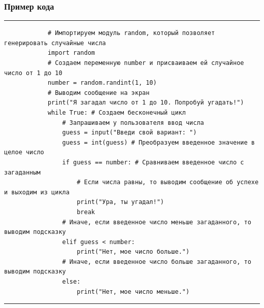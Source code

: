 \documentclass[handout]{beamer}
\begin{document}
    \begin{frame}[fragile]
        \frametitle{Пример кода}
        \scriptsize
        \rule{\textwidth}{1pt}
        \begin{verbatim}
            # Импортируем модуль random, который позволяет генерировать случайные числа
            import random
            # Создаем переменную number и присваиваем ей случайное число от 1 до 10
            number = random.randint(1, 10)
            # Выводим сообщение на экран
            print("Я загадал число от 1 до 10. Попробуй угадать!")
            while True: # Создаем бесконечный цикл
                # Запрашиваем у пользователя ввод числа
                guess = input("Введи свой вариант: ") 
                guess = int(guess) # Преобразуем введенное значение в целое число
                if guess == number: # Сравниваем введенное число с загаданным
                    # Если числа равны, то выводим сообщение об успехе и выходим из цикла
                    print("Ура, ты угадал!")
                    break
                # Иначе, если введенное число меньше загаданного, то выводим подсказку
                elif guess < number:
                    print("Нет, мое число больше.")
                # Иначе, если введенное число больше загаданного, то выводим подсказку
                else:
                    print("Нет, мое число меньше.")
        \end{verbatim}
        \rule{\textwidth}{1pt}
    \end{frame}
\end{document}

